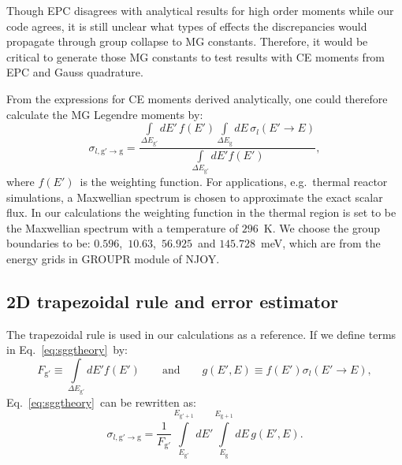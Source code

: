 \documentclass[review]{elsarticle}
\newcommand{\fgp}{F_\mathrm{g'}}
\newcommand{\sgg}{\sigma_{l,\mathrm{g'}\to \mathrm{g}}}
\newcommand{\eg}{E_\mathrm{g}}
\newcommand{\egp}{E_\mathrm{g'}}
\newcommand{\ego}{E_\mathrm{g+1}}
\newcommand{\egpo}{E_\mathrm{g'+1}}
\begin{document}
Though EPC disagrees with analytical results for high order moments while our code agrees, it is still unclear what types of effects the discrepancies would propagate through group collapse to MG constants. Therefore, it would be critical to generate those MG constants to test results with CE moments from EPC and Gauss quadrature.

From the expressions for CE moments derived analytically, one could therefore calculate the MG Legendre moments by:
\begin{equation}\label{eq:sggtheory}
\sigma_{l,\mathrm{g'}\to\mathrm{g}}=\frac{\int\limits_{\Delta E_\mathrm{g'}}dE'\,f(E')\int\limits_{\Delta E_\mathrm{g}}dE\,\sigma_l(E'\to E)}{\int\limits_{\Delta E_\mathrm{g'}}dE'f(E')},
\end{equation}
where $f(E')$~is the weighting function. For applications, e.g.~thermal reactor simulations, a Maxwellian spectrum is chosen to approximate the exact scalar flux. In our calculations the weighting function in the thermal region is set to be the Maxwellian spectrum with a temperature of $296$~K. We choose the group boundaries to be: $0.596$,~$10.63$,~$56.925$~and $145.728$~meV, which are from the energy grids in GROUPR module of NJOY\cite{NJOY}.

\subsection{2D trapezoidal rule and error estimator}

The trapezoidal rule is used in our calculations as a reference. %
If we define terms in Eq.~\eqref{eq:sggtheory}~by:
\begin{equation}
\fgp\equiv\int\limits_{\Delta\egp}dE'f(E')\qquad\mathrm{and}\qquad g(E',E)\equiv f(E')\sigma_l(E'\to E),
\end{equation}
Eq.~\eqref{eq:sggtheory}~can be rewritten as:
\begin{equation}\label{eq:sggnew}
\sgg=\frac{1}{\fgp}\int\limits_{\egp}^{\egpo} dE'\int\limits_{\eg}^{\ego} dE\,g(E',E).
\end{equation}
\end{document}
